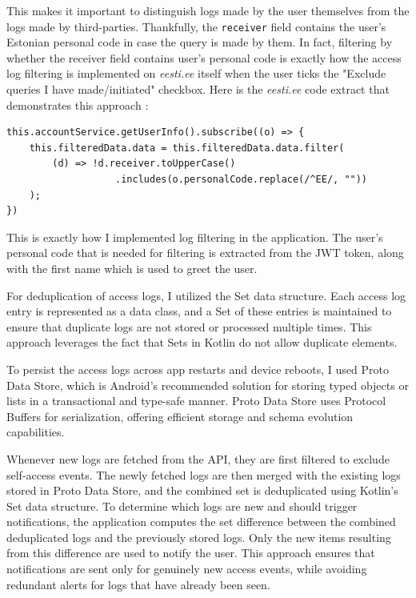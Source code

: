 This makes it important to distinguish logs made by the user themselves from the logs made by third-parties. Thankfully, the \texttt{receiver} field contains the user's Estonian personal code in case the query is made by them. In fact, filtering by whether the receiver field contains user's personal code is exactly how the access log filtering is implemented on \textit{eesti.ee} itself when the user ticks the "Exclude queries I have made/initiated" checkbox. Here is the \textit{eesti.ee} code extract that demonstrates this approach \cite{eesti-ee-portal}:

\begin{small}
\begin{verbatim}
this.accountService.getUserInfo().subscribe((o) => {
    this.filteredData.data = this.filteredData.data.filter(
        (d) => !d.receiver.toUpperCase()
                   .includes(o.personalCode.replace(/^EE/, ""))
    );
})
\end{verbatim}
\end{small}

This is exactly how I implemented log filtering in the application. The user's personal code that is needed for filtering is extracted from the JWT token, along with the first name which is used to greet the user.

For deduplication of access logs, I utilized the Set data structure. Each access log entry is represented as a data class, and a Set of these entries is maintained to ensure that duplicate logs are not stored or processed multiple times. This approach leverages the fact that Sets in Kotlin do not allow duplicate elements.

To persist the access logs across app restarts and device reboots, I used Proto Data Store, which is Android's recommended solution for storing typed objects or lists in a transactional and type-safe manner. Proto Data Store uses Protocol Buffers \cite{protocol-buffers} for serialization, offering efficient storage and schema evolution capabilities.

Whenever new logs are fetched from the API, they are first filtered to exclude self-access events. The newly fetched logs are then merged with the existing logs stored in Proto Data Store, and the combined set is deduplicated using Kotlin's Set data structure. To determine which logs are new and should trigger notifications, the application computes the set difference between the combined deduplicated logs and the previously stored logs. Only the new items resulting from this difference are used to notify the user. This approach ensures that notifications are sent only for genuinely new access events, while avoiding redundant alerts for logs that have already been seen.

